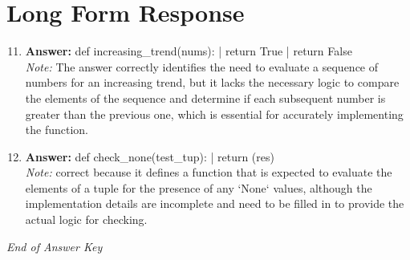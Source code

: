 \documentclass[12pt]{article}
\begin{document}
\section*{Long Form Response}
\begin{enumerate}[label=\arabic*.]
\setcounter{enumi}{10}
\item \textbf{Answer:} def increasing\_trend(nums): | return True | return False
\\ \textit{Note:} The answer correctly identifies the need to evaluate a sequence of numbers for an increasing trend, but it lacks the necessary logic to compare the elements of the sequence and determine if each subsequent number is greater than the previous one, which is essential for accurately implementing the function.
\item \textbf{Answer:} def check\_none(test\_tup): | return (res)
\\ \textit{Note:} correct because it defines a function that is expected to evaluate the elements of a tuple for the presence of any `None` values, although the implementation details are incomplete and need to be filled in to provide the actual logic for checking.
\end{enumerate}

\vfill
\noindent\textit{End of Answer Key}
\end{document}
